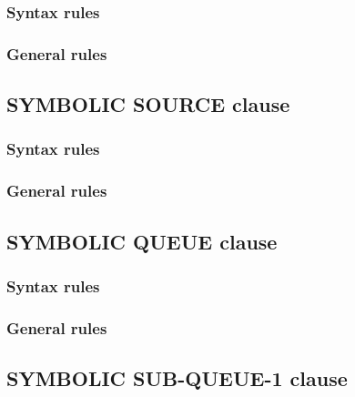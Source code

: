 \subsubsection{Syntax rules}

\subsubsection{General rules}

\subsection{SYMBOLIC SOURCE clause}

\begin{syntax}[\deletedcolour]
\end{syntax}

\subsubsection{Syntax rules}

\subsubsection{General rules}

\subsection{SYMBOLIC QUEUE clause}

\begin{syntax}[\deletedcolour]
\end{syntax}

\subsubsection{Syntax rules}

\subsubsection{General rules}

\subsection{SYMBOLIC SUB-QUEUE-1 clause}

\begin{syntax}[\deletedcolour]
\end{syntax}

